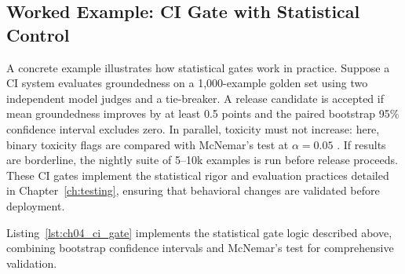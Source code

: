 \subsection{Worked Example: CI Gate with Statistical Control}
A concrete example illustrates how statistical gates work in practice. Suppose a CI system evaluates groundedness on a 1,000-example golden set using two independent model judges and a tie-breaker. A release candidate is accepted if mean groundedness improves by at least 0.5 points and the paired bootstrap 95\% confidence interval excludes zero. In parallel, toxicity must not increase: here, binary toxicity flags are compared with McNemar's test at $\alpha = 0.05$ \cite{mcnemar1947,koehn2004}. If results are borderline, the nightly suite of 5--10k examples is run before release proceeds. These CI gates implement the statistical rigor and evaluation practices detailed in Chapter~\ref{ch:testing}, ensuring that behavioral changes are validated before deployment.

Listing~\ref{lst:ch04_ci_gate} implements the statistical gate logic described above, combining bootstrap confidence intervals and McNemar's test for comprehensive validation.

